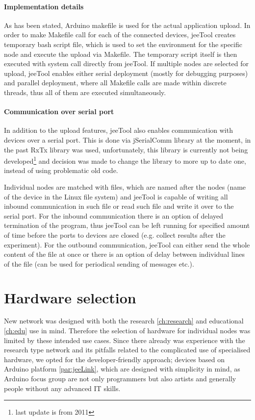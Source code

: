 \documentclass[
  print, %
  table,   %
  nolof,     %
  nolot,     %
           oneside
]{fithesis3}
\begin{document}
\paragraph{Implementation details}
  As has been stated, Arduino makefile is used for the actual application upload. In order to make Makefile call for each of the connected devices, jeeTool creates temporary bash script file, which is used to set the environment for the specific node and execute the upload via Makefile. The temporary script itself is then executed with system call directly from jeeTool. If multiple nodes are selected for upload, jeeTool enables either serial deployment (mostly for debugging purposes) and parallel deployment, where all Makefile calls are made within discrete threads, thus all of them are executed simultaneously.

\paragraph{Communication over serial port}
  In addition to the upload features, jeeTool also enables communication with devices over a serial port. This is done via jSerialComm library \cite{jserial}
  at the moment, in the past RxTx library \cite{rxtx}
  was used, unfortunately, this library is currently not being developed\footnote{last update is from 2011} and decision was made to change the library to more up to date one, instead of using problematic old code.

  Individual nodes are matched with files, which are named after the nodes (name of the device in the Linux file system) and jeeTool is capable of writing all inbound communication in such file or read such file and write it over to the serial port. For the inbound communication there is an option of delayed termination of the program, thus jeeTool can be left running for specified amount of time before the ports to devices are closed (e.g. collect results after the experiment). For the outbound communication, jeeTool can either send the whole content of the file at once or there is an option of delay between individual lines of the file (can be used for periodical sending of messages etc.).

  \section{Hardware selection}\label{sec:hw}
  New network was designed with both the research \ref{ch:research} and educational \ref{ch:edu} use in mind. Therefore the selection of hardware for individual nodes was limited by these intended use cases. Since there already was experience with the research type network \cite{Matyas2015}
  and its pitfalls related to the complicated use of specialised hardware, we opted for the developer-friendly approach; devices based on Arduino platform \ref{par:jeeLink}, which are designed with simplicity in mind, as Arduino focus group are not only programmers but also artists and generally people without any advanced IT skills.
\end{document}
